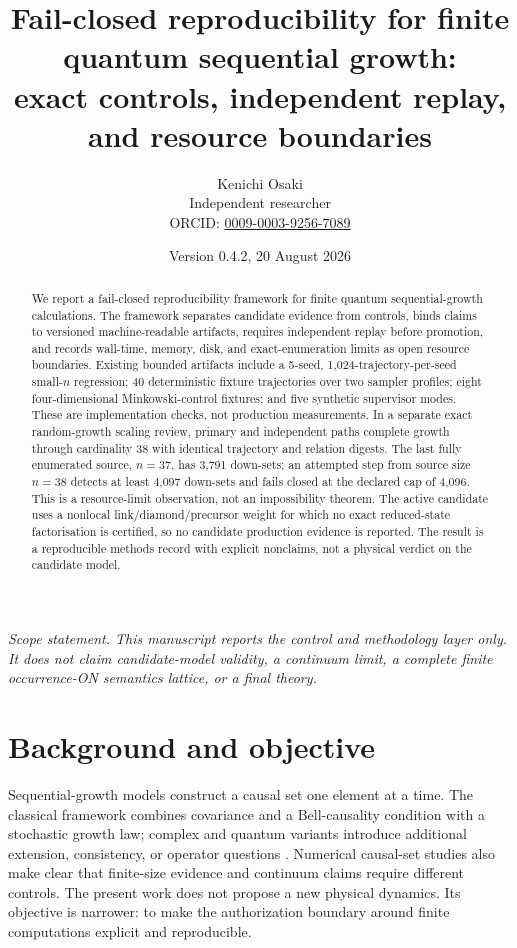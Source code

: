 \documentclass[11pt]{article}
\title{\textbf{Fail-closed reproducibility for finite quantum sequential growth:\\
exact controls, independent replay, and resource boundaries}}
\author{Kenichi Osaki\\
\small Independent researcher\\
\small ORCID: \href{https://orcid.org/0009-0003-9256-7089}{0009-0003-9256-7089}}
\date{Version 0.4.2, 20 August 2026}
\begin{document}
\maketitle

\begin{center}
\small\emph{Scope statement.  This manuscript reports the control and
methodology layer only.  It does not claim candidate-model validity, a
continuum limit, a complete finite occurrence-ON semantics lattice, or a
final theory.}
\end{center}

\begin{abstract}
We report a fail-closed reproducibility framework for finite quantum
sequential-growth calculations.  The framework separates candidate evidence
from controls, binds claims to versioned machine-readable artifacts, requires
independent replay before promotion, and records wall-time, memory, disk, and
exact-enumeration limits as open resource boundaries.  Existing bounded
artifacts include a 5-seed, 1,024-trajectory-per-seed small-$n$ regression; 40
deterministic fixture trajectories over two sampler profiles; eight
four-dimensional Minkowski-control fixtures; and five synthetic supervisor
modes.  These are implementation checks, not production measurements.  In a
separate exact random-growth scaling review, primary and independent paths
complete growth through cardinality 38 with identical trajectory and relation
digests.  The last fully enumerated source, $n=37$, has 3,791 down-sets; an
attempted step from source size $n=38$ detects at least 4,097 down-sets and
fails closed at the declared cap of 4,096.  This is a resource-limit
observation, not an impossibility theorem.  The active candidate uses a
nonlocal link/diamond/precursor weight for which no exact reduced-state
factorisation is certified, so no candidate production evidence is reported.
The result is a reproducible methods record with explicit nonclaims, not a
physical verdict on the candidate model.
\end{abstract}

\section{Background and objective}

Sequential-growth models construct a causal set one element at a time.  The
classical framework combines covariance and a Bell-causality condition with a
stochastic growth law\cite{RideoutSorkin2000}; complex and quantum variants
introduce additional extension, consistency, or operator questions
\cite{SuryaZalel2020,Gudder2012,SrivastavaSurya2026}.  Numerical causal-set
studies also make clear that finite-size evidence and continuum claims require
different controls\cite{GlaserOConnorSurya2018}.  The present work does not
propose a new physical dynamics.  Its objective is narrower: to make the
authorization boundary around finite computations explicit and reproducible.
\end{document}
